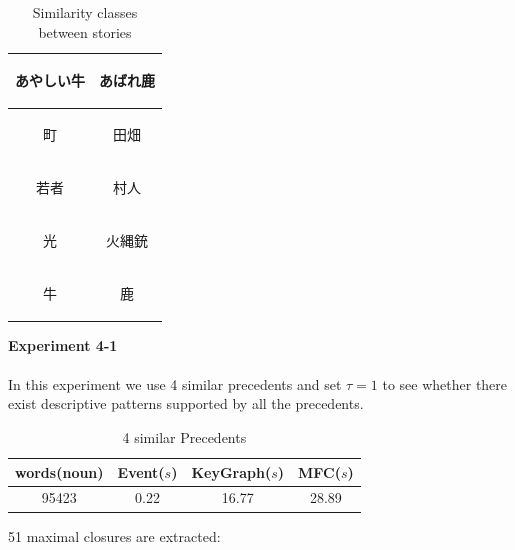 \begin{table}[!h]
\centering
\begin{tabular}{cc}
\hline
\begin{CJK}{UTF8}{ipxm}\textbf{あやしい牛}\end{CJK}&\begin{CJK}{UTF8}{ipxm}\textbf{あばれ鹿}\end{CJK}\\
\hline
\begin{CJK}{UTF8}{ipxm}町\end{CJK}&\begin{CJK}{UTF8}{ipxm}田畑\end{CJK}\\
\begin{CJK}{UTF8}{ipxm}若者\end{CJK}&\begin{CJK}{UTF8}{ipxm}村人\end{CJK}\\
\begin{CJK}{UTF8}{ipxm}光\end{CJK}&\begin{CJK}{UTF8}{ipxm}火縄銃\end{CJK}\\
\begin{CJK}{UTF8}{ipxm}牛\end{CJK}&\begin{CJK}{UTF8}{ipxm}鹿\end{CJK}\\
\hline
\end{tabular}
\caption{Similarity classes between stories}
\end{table}
\newpage
\textbf{Experiment 4-1}
\\ \\
In this experiment we use 4 similar precedents and set $\tau = 1$ to see whether there exist descriptive patterns supported by all the precedents.
\begin{table}[!h]
\centering
\begin{tabular}{cccc}
\hline
words(noun)&Event($s$)&KeyGraph($s$)&MFC($s$)\\
\hline
95423&0.22&16.77&28.89\\
\hline
\end{tabular}
\caption{4 similar Precedents}
\end{table}
51 maximal closures are extracted:
